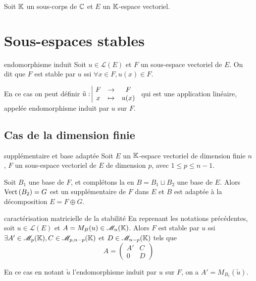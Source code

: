 Soit $\mathbb{K}$ un sous-corps de $\mathbb{C}$ et $E$ un $\mathbb{K}$-espace vectoriel.
 
\section{Sous-espaces stables}

\begin{definition}{endomorphisme induit}{}
    Soit $u \in \mathscr L(E)$ et $F$ un sous-espace vectoriel de $E$. On dit que 
    $F$ est stable par $u$ ssi $\forall x \in F, u(x) \in F$.

    En ce cas on peut définir $\tilde u: \space \begin{array}{|ccc} \displaystyle F & \to & \displaystyle F \\ \displaystyle x & \mapsto & \displaystyle u(x) \end{array}$ qui est une application 
    linéaire, appelée endomorphisme induit par $u$ sur $F$.
\end{definition}

\subsection{Cas de la dimension finie}

\begin{proposition}{supplémentaire et base adaptée}{}
    Soit $E$ un $\mathbb{K}$-espace vectoriel de dimension finie $n$, $F$ un sous-espace vectoriel de $E$
    de dimension $p$, avec $1 \leqslant p \leqslant n - 1$. 

    Soit $B_1$ une base de $F$, et complétons la en $B = B_1 \sqcup B_2$ une base de $E$. Alors 
    $\operatorname{Vect} \, (B_2) = G$ est un supplémentaire de $F$ dans $E$ et 
    $B$ est adaptée à la décomposition $E = F \oplus G$.

\end{proposition}

\begin{proposition}{caractérisation matricielle de la stabilité}{}
    En reprenant les notations précédentes, soit $u \in \mathscr L(E)$ et $A = M_B(u) \in \mathscr M_n(\mathbb{K})$. 
    Alors $F$ est stable par $u$ ssi 
    $\exists A' \in \mathscr M_{p}(\mathbb{K}), C \in \mathscr M_{p, n - p}(\mathbb{K})$ et $D \in \mathscr M_{n - p}(\mathbb{K})$ tels que
    \[
        A = \begin{pmatrix}
            A' & C \\
            0 & D
        \end{pmatrix}
    \]

    En ce cas en notant $\tilde u$ l'endomorphisme induit par $u$ sur $F$, on a $A' = M_{B_1}(\tilde u)$.
\end{proposition}


